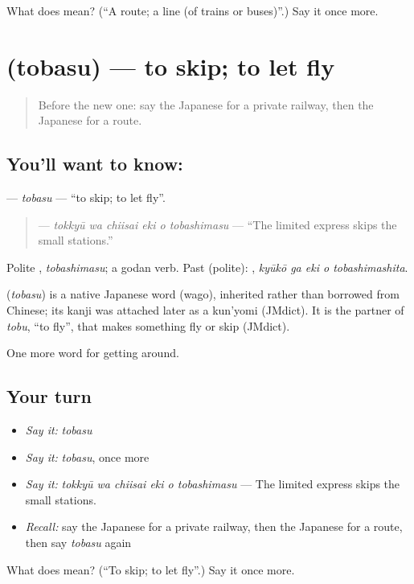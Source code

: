\begin{tcolorbox}[breakable,colback=teal!4,colframe=teal!35!black,title={Before you move on}]
What does  mean? (\textquotedblleft{}A route; a line (of trains or buses)\textquotedblright{}.) Say it once more.
\end{tcolorbox}
\section[\texorpdfstring{\ja{とばす} (tobasu)}{とばす (tobasu)}]{ (tobasu) — to skip; to let fly}

\label{lesson:JA-C376-tobasu}



\begin{quote}
Before the new one: say the Japanese for a private railway, then the Japanese for a route.
\end{quote}

\subsection*{You'll want to know: }
\textbf{} — \emph{tobasu} — \textquotedblleft{}to skip; to let fly\textquotedblright{}.

\begin{quote}
\textbf{   } — \emph{tokkyū wa chiisai eki o tobashimasu} — \textquotedblleft{}The limited express skips the small stations.\textquotedblright{}
\end{quote}

Polite \textbf{}, \emph{tobashimasu}; a godan verb. Past (polite): \textbf{  }, \emph{kyūkō ga eki o tobashimashita}.

\begin{cousinweb}
\textbf{} (\emph{tobasu}) is a native Japanese word (wago), inherited rather than borrowed from Chinese; its kanji was attached later as a kun'yomi (JMdict). It is the partner of \emph{tobu}, \textquotedblleft{}to fly\textquotedblright{}, that makes something fly or skip (JMdict).
\end{cousinweb}

\begin{grammarlens}[title={What you've built}]
One more word for getting around.
\end{grammarlens}

\subsection*{Your turn}
\begin{itemize}
\raggedright
  \item \emph{Say it:} \emph{tobasu}
  \item \emph{Say it:} \emph{tobasu}, once more
  \item \emph{Say it:} \emph{tokkyū wa chiisai eki o tobashimasu} — The limited express skips the small stations.
  \item \emph{Recall:} say the Japanese for a private railway, then the Japanese for a route, then say \emph{tobasu} again
\end{itemize}

\begin{tcolorbox}[breakable,colback=teal!4,colframe=teal!35!black,title={Before you move on}]
What does  mean? (\textquotedblleft{}To skip; to let fly\textquotedblright{}.) Say it once more.
\end{tcolorbox}
